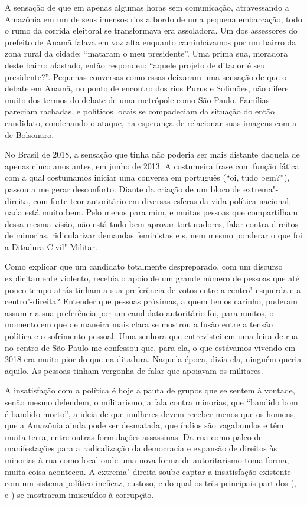 A sensação de que em apenas algumas horas sem comunicação, atravessando
a Amazônia em um de seus imensos rios a bordo de uma pequena embarcação,
todo o rumo da corrida eleitoral se transformava era assoladora. Um dos
assessores do prefeito de Anamã falava em voz alta enquanto caminhávamos por um
bairro da zona rural da cidade: ``mataram o meu presidente''. Uma prima
sua, moradora deste bairro afastado, então respondeu: ``aquele projeto
de ditador é seu presidente?''. Pequenas conversas como essas deixaram
uma sensação de que o debate em Anamã, no ponto de encontro dos rios
Purus e Solimões, não difere muito dos termos do debate de uma metrópole
como São Paulo. Famílias pareciam rachadas, e políticos locais se
compadeciam da situação do então candidato, condenando o ataque, na
esperança de relacionar suas imagens com a de Bolsonaro.

No Brasil de 2018, a sensação que tinha não poderia ser mais distante
daquela de apenas cinco anos antes, em junho de 2013. A costumeira frase
com função fática com a qual costumamos iniciar uma conversa em
português (``oi, tudo bem?''), passou a me gerar desconforto. Diante da
criação de um bloco de extrema"-direita, com forte teor autoritário em
diversas esferas da vida política nacional, nada está muito bem. Pelo
menos para mim, e muitas pessoas que compartilham dessa mesma visão, não
está tudo bem aprovar torturadores, falar contra direitos de minorias,
ridicularizar demandas feministas e s, nem mesmo ponderar o que
foi a Ditadura Civil"-Militar.

Como explicar que um candidato totalmente despreparado, com um discurso
explicitamente violento, recebia o apoio de um grande número de pessoas
que até pouco tempo atrás tinham a sua preferência de votos entre a
centro"-esquerda e a centro"-direita? Entender que pessoas próximas, a
quem temos carinho, puderam assumir a sua preferência por um candidato
autoritário foi, para muitos, o momento em que de maneira mais clara se
mostrou a fusão entre a tensão política e o sofrimento pessoal. Uma
senhora que entrevistei em uma feira de rua no centro de São Paulo
me confessou que, para ela, o
que estávamos vivendo em 2018 era muito pior do que na ditadura. Naquela
época, dizia ela, ninguém queria aquilo. As pessoas tinham vergonha de
falar que apoiavam os militares.

A insatisfação com a política é hoje a pauta de grupos que se sentem à
vontade, senão mesmo defendem, o militarismo, a fala contra minorias,
que ``bandido bom é bandido morto'', a ideia de que mulheres devem
receber menos que os homens, que a Amazônia ainda pode ser desmatada,
que índios são vagabundos e têm muita terra, entre outras formulações assassinas. Da rua como palco de manifestações para a radicalização da
democracia e expansão de direitos às minorias à rua como local onde uma
nova forma de autoritarismo toma forma, muita coisa aconteceu. A
extrema"-direita soube captar a insatisfação existente com um sistema
político ineficaz, custoso, e do qual os três principais partidos (,
 e ) se mostraram imiscuídos à corrupção.

